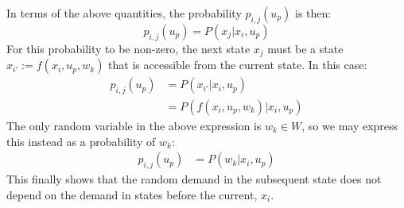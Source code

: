 \documentclass[conference]{IEEEtran}
\begin{document}
In terms of the above quantities, the probability $p_{i,j}(u_{p})$ is then: 
\begin{displaymath}
p_{i,j}(u_{p})= P(x_{j}| x_{i},u_{p})
\end{displaymath} For this probability to be non-zero, the next state $x_{j}$ must be a state $x_{i'}:=f(x_{i},u_{p},w_{k})$ that is accessible from the current state. In this case:
\begin{align*} 
p_{i,j}(u_{p})&= P(x_{i'}| x_{i},u_{p})\\ 
&= P(f(x_{i},u_{p},w_{k})| x_{i},u_{p})
\end{align*} The only random variable in the above expression is $w_{k}\in W$, so we may express this instead as a probability of $w_{k}$:
\begin{align*} 
p_{i,j}(u_{p})&= P(w_{k} | x_{i},u_{p})
\end{align*} This finally shows that the random demand in the subsequent state does not depend on the demand in states before the current, $x_{i}$. 




\end{document}
